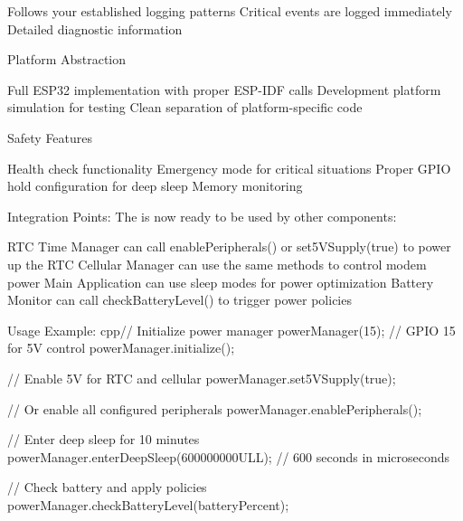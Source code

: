 Follows your established logging patterns Critical events are logged immediately Detailed diagnostic information


\begin{DoxyEnumerate}
\item Platform Abstraction
\end{DoxyEnumerate}

Full ESP32 implementation with proper ESP-\/\+IDF calls Development platform simulation for testing Clean separation of platform-\/specific code


\begin{DoxyEnumerate}
\item Safety Features
\end{DoxyEnumerate}

Health check functionality Emergency mode for critical situations Proper GPIO hold configuration for deep sleep Memory monitoring

Integration Points\+: The  is now ready to be used by other components\+:

RTC Time Manager can call enable\+Peripherals() or set5\+VSupply(true) to power up the RTC Cellular Manager can use the same methods to control modem power Main Application can use sleep modes for power optimization Battery Monitor can call check\+Battery\+Level() to trigger power policies

Usage Example\+: cpp// Initialize power manager  power\+Manager(15); // GPIO 15 for 5V control power\+Manager.\+initialize();

// Enable 5V for RTC and cellular power\+Manager.\+set5\+VSupply(true);

// Or enable all configured peripherals power\+Manager.\+enable\+Peripherals();

// Enter deep sleep for 10 minutes power\+Manager.\+enter\+Deep\+Sleep(600000000\+ULL); // 600 seconds in microseconds

// Check battery and apply policies power\+Manager.\+check\+Battery\+Level(battery\+Percent); 
